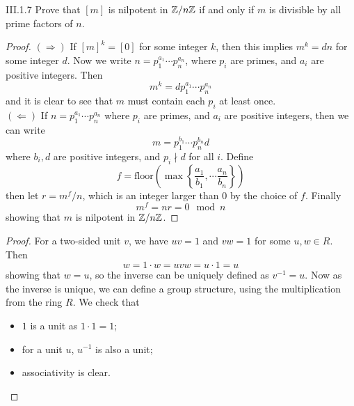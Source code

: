\begin{problem}{III.1.7}
Prove that $[m]$ is nilpotent in $\mathbb{Z}/n\mathbb{Z}$ if and only if $m$ is divisible by all prime factors of $n$.
\end{problem}
\begin{proof}

\noindent $(\Rightarrow)$ If $[m]^k = [0]$ for some integer $k$, then this implies $m^k = dn$ for some integer $d$. Now we write $n = p_1^{a_1} \cdots p_n^{a_n}$, where $p_i$ are primes, and $a_i$ are positive integers. Then
\[
m^k = d p_1^{a_1} \cdots p_n^{a_n}
\]
and it is clear to see that $m$ must contain each $p_i$ at least once. \\
$(\Leftarrow)$ If $n = p_1^{a_1} \cdots p_n^{a_n}$ where $p_i$ are primes, and $a_i$ are positive integers, then we can write
\[
m = p_1^{b_1} \cdots p_n^{b_n} d
\]
where $b_i, d$ are positive integers, and $p_i \nmid d$ for all $i$. Define
\[
f = \text{floor}\left(\max\left\{ \frac{a_1}{b_1}, \cdots \frac{a_n}{b_n}\right\} \right)
\]
then let $r = m^f/n$, which is an integer larger than 0 by the choice of $f$. Finally
\[
m^f = nr = 0 \mod n
\]
showing that $m$ is nilpotent in $\mathbb{Z}/n\mathbb{Z}$.
\end{proof}

\begin{proof}
For a two-sided unit $v$, we have $uv = 1$ and $vw = 1$ for some $u,w \in R$. Then
\[
w = 1 \cdot w = uvw = u \cdot 1 = u
\]
showing that $w = u$, so the inverse can be uniquely defined as $v^{-1} = u$. Now as the inverse is unique, we can define a group structure, using the multiplication from the ring $R$. We check that
\begin{itemize}
	\setlength\itemsep{0pt}
	\item $1$ is a unit as $1 \cdot 1 = 1$;
	\item for a unit $u$, $u^{-1}$ is also a unit;
	\item associativity is clear.
\end{itemize}
\end{proof}

